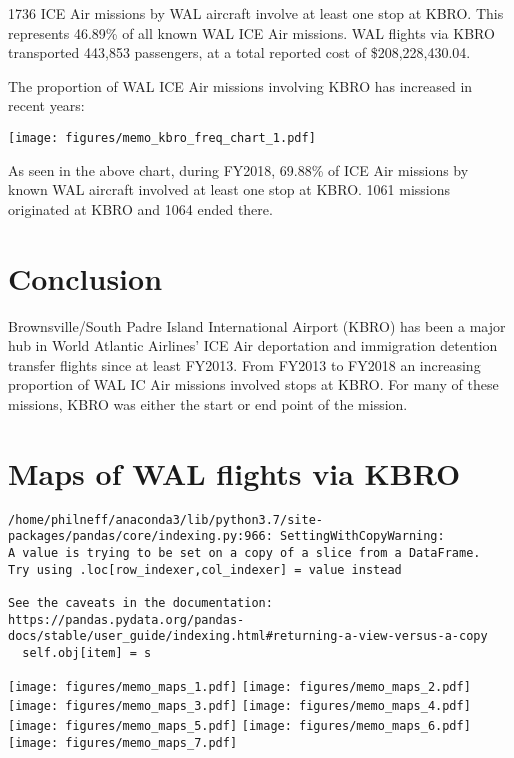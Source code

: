 \documentclass[a4paper,11pt,final]{article}
\begin{document}
1736 ICE Air missions by WAL aircraft involve at least one stop at KBRO.
This represents 46.89\% of all known WAL ICE Air missions. WAL flights
via KBRO transported 443,853 passengers, at a total reported cost of
\$208,228,430.04.

The proportion of WAL ICE Air missions involving KBRO has increased in
recent years:

\texttt{[image: figures/memo\_kbro\_freq\_chart\_1.pdf]}

As seen in the above chart, during FY2018, 69.88\% of ICE Air missions
by known WAL aircraft involved at least one stop at KBRO. 1061 missions
originated at KBRO and 1064 ended there.

\section{Conclusion}

Brownsville/South Padre Island International Airport (KBRO) has been a
major hub in World Atlantic Airlines' ICE Air deportation and
immigration detention transfer flights since at least FY2013. From
FY2013 to FY2018 an increasing proportion of WAL IC Air missions
involved stops at KBRO. For many of these missions, KBRO was either the
start or end point of the mission.

\appendix
\section{Maps of WAL flights via KBRO}





\begin{Verbatim}[commandchars=\\\{\},frame=leftline,fontsize=\small, xleftmargin=0.5em]
/home/philneff/anaconda3/lib/python3.7/site-
packages/pandas/core/indexing.py:966: SettingWithCopyWarning:
A value is trying to be set on a copy of a slice from a DataFrame.
Try using .loc[row_indexer,col_indexer] = value instead

See the caveats in the documentation:
https://pandas.pydata.org/pandas-
docs/stable/user_guide/indexing.html#returning-a-view-versus-a-copy
  self.obj[item] = s
\end{Verbatim}



\texttt{[image: figures/memo\_maps\_1.pdf]}
\texttt{[image: figures/memo\_maps\_2.pdf]}
\texttt{[image: figures/memo\_maps\_3.pdf]}
\texttt{[image: figures/memo\_maps\_4.pdf]}
\texttt{[image: figures/memo\_maps\_5.pdf]}
\texttt{[image: figures/memo\_maps\_6.pdf]}
\texttt{[image: figures/memo\_maps\_7.pdf]}
\end{document}
